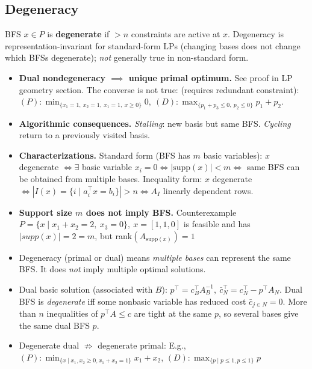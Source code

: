 \documentclass{article}
\begin{document}
\subsection{Degeneracy}

BFS $x\in P$ is \textbf{degenerate} if $>n$ constraints are active at $x$.   
Degeneracy is representation-invariant for standard-form LPs (changing bases does not change which BFSs degenerate); \emph{not} generally true in non-standard form.

\begin{itemize}
    
    
    \item \textbf{Dual nondegeneracy $\implies$ unique primal optimum.} See proof in LP geometry section. The converse is not true: (requires redundant constraint): $(P):\min_{\{x_1=1,\ x_2=1,\ x_1=1,\ x\geq0\}}0,\ (D):\max_{\{p_1 + p_3\leq0,\ p_2\leq0\}}p_1 + p_2$. 
    
    \item \textbf{Algorithmic consequences.}
    \emph{Stalling}: new basis but same BFS. \emph{Cycling} return to a previously visited basis.

    \item \textbf{Characterizations.}
    Standard form (BFS has $m$ basic variables): $x$ degenerate $\iff \exists$ basic variable $x_i = 0 \iff |\mathrm{supp}(x)| < m \iff$ same BFS can be obtained from multiple bases. 
    Inequality form: $x$ degenerate $\iff |I(x)=\{i\mid a_i^\top x = b_i\}| > n \iff A_I$ linearly dependent rows.


    \item \textbf{Support size $m$ does not imply BFS.} Counterexample $P=\{x\mid x_1 + x_2 = 2,\ x_3 = 0\},\ x=[1,1,0]$ is feasible and has $|supp(x)|=2=m$, but rank$\left(A_{\mathrm{supp}(x)}\right) = 1$

    \item Degeneracy (primal or dual) means \emph{multiple bases} can represent the same BFS. It does \emph{not} imply multiple optimal solutions.
    
    \item Dual basic solution (associated with $B$): $p^\top = c_B^\top A_B^{-1},\ \bar c_N^\top = c_N^\top - p^\top A_N$.
    Dual BFS is \emph{degenerate} iff some nonbasic variable has reduced cost $\bar c_{j\in N} = 0$.
    More than $n$ inequalities of $p^\top A \le c$ are tight at the same $p$, so several bases give the same dual BFS $p$.

    \item Degenerate dual $\not \Rightarrow$ degenerate primal: E.g., $(P):\min_{\{x\mid x_1, x_2 \geq 0, x_1 + x_2 = 1\}}x_1 + x_2$, $(D): \max_{\{p\mid p\leq 1, p\leq 1\}}p$
\end{itemize}
\end{document}
